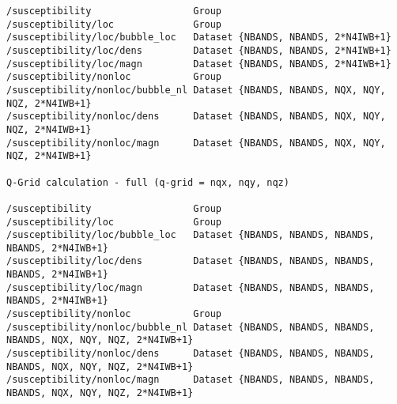 \documentclass[a4paper,11pt]{article}
\numberwithin{equation}{section} %
\begin{document}
\begin{lstlisting}[caption=susceptibility output comparison, frame=single, basicstyle=\scriptsize]
/susceptibility                  Group
/susceptibility/loc              Group
/susceptibility/loc/bubble_loc   Dataset {NBANDS, NBANDS, 2*N4IWB+1}
/susceptibility/loc/dens         Dataset {NBANDS, NBANDS, 2*N4IWB+1}
/susceptibility/loc/magn         Dataset {NBANDS, NBANDS, 2*N4IWB+1}
/susceptibility/nonloc           Group
/susceptibility/nonloc/bubble_nl Dataset {NBANDS, NBANDS, NQX, NQY, NQZ, 2*N4IWB+1}
/susceptibility/nonloc/dens      Dataset {NBANDS, NBANDS, NQX, NQY, NQZ, 2*N4IWB+1}
/susceptibility/nonloc/magn      Dataset {NBANDS, NBANDS, NQX, NQY, NQZ, 2*N4IWB+1}

Q-Grid calculation - full (q-grid = nqx, nqy, nqz)

/susceptibility                  Group
/susceptibility/loc              Group
/susceptibility/loc/bubble_loc   Dataset {NBANDS, NBANDS, NBANDS, NBANDS, 2*N4IWB+1}
/susceptibility/loc/dens         Dataset {NBANDS, NBANDS, NBANDS, NBANDS, 2*N4IWB+1}
/susceptibility/loc/magn         Dataset {NBANDS, NBANDS, NBANDS, NBANDS, 2*N4IWB+1}
/susceptibility/nonloc           Group
/susceptibility/nonloc/bubble_nl Dataset {NBANDS, NBANDS, NBANDS, NBANDS, NQX, NQY, NQZ, 2*N4IWB+1}
/susceptibility/nonloc/dens      Dataset {NBANDS, NBANDS, NBANDS, NBANDS, NQX, NQY, NQZ, 2*N4IWB+1}
/susceptibility/nonloc/magn      Dataset {NBANDS, NBANDS, NBANDS, NBANDS, NQX, NQY, NQZ, 2*N4IWB+1}

\end{lstlisting}
\end{document}
